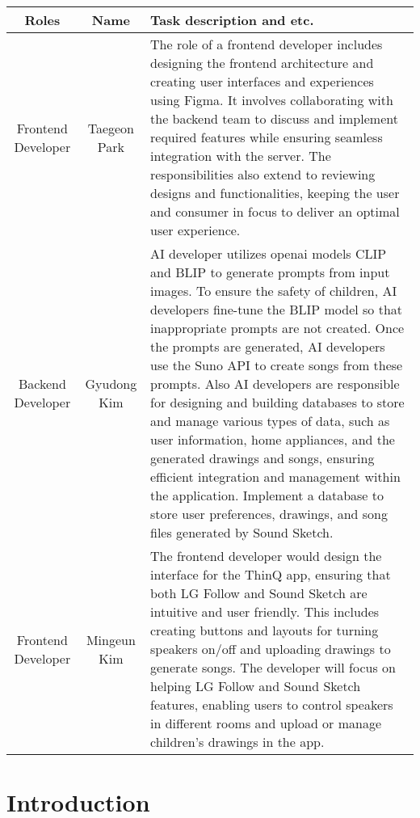 \documentclass[conference]{IEEEtran}
\begin{document}
\vspace{0.8cm}

\begin{table}[h!]
\centering
\begin{tabular}{|c|c|p{3.5cm}|}
\hline
\textbf{Roles} & \textbf{Name} & \textbf{Task description and etc.} \\
\hline
Frontend Developer & Taegeon Park & The role of a frontend developer includes designing the frontend architecture and creating user interfaces and experiences using Figma. It involves collaborating with the backend team to discuss and implement required features while ensuring seamless integration with the server. The responsibilities also extend to reviewing designs and functionalities, keeping the user and consumer in focus to deliver an optimal user experience. \\
\hline
Backend Developer & Gyudong Kim & AI developer utilizes openai models CLIP and BLIP to generate prompts from input images. To ensure the safety of children, AI developers fine-tune the BLIP model so that inappropriate prompts are not created. Once the prompts are generated, AI developers use the Suno API to create songs from these prompts. Also AI developers are responsible for designing and building databases to store and manage various types of data, such as user information, home appliances, and the generated drawings and songs, ensuring efficient integration and management within the application. Implement a database to store user preferences, drawings, and song files generated by Sound Sketch. \\
\hline
Frontend Developer & Mingeun Kim & The frontend developer would design the interface for the ThinQ app, ensuring that both LG Follow and Sound Sketch are intuitive and user friendly. This includes creating buttons and layouts for turning speakers on/off and uploading drawings to generate songs. The developer will focus on helping LG Follow and Sound Sketch features, enabling users to control speakers in different rooms and upload or manage children's drawings in the app.  \\
\hline
\end{tabular}
\end{table}


\IEEEpeerreviewmaketitle

\section{Introduction}
\end{document}
